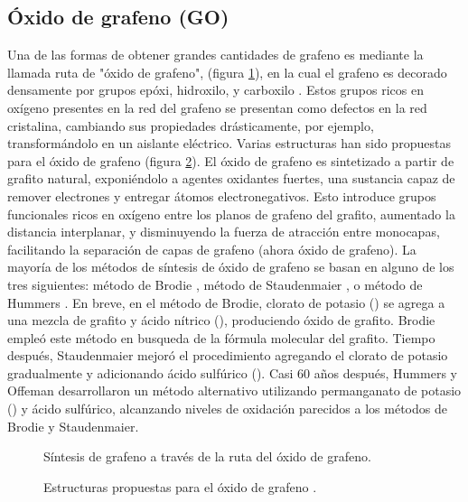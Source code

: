 \subsection*{Óxido de grafeno (GO)}
Una de las formas de obtener grandes cantidades de grafeno es mediante la llamada ruta de "óxido de grafeno", (figura \ref{fig:graphiteToRGO}), en la cual el grafeno es decorado densamente por grupos epóxi, hidroxilo, y carboxilo \citep{Dreyer2010}. Estos grupos ricos en oxígeno presentes en la red del grafeno se presentan como defectos en la red cristalina, cambiando sus propiedades drásticamente, por ejemplo, transformándolo en un aislante eléctrico. Varias estructuras han sido propuestas para el óxido de grafeno (figura \ref{fig:GO_structure}).
El óxido de grafeno es sintetizado a partir de grafito natural, exponiéndolo a agentes oxidantes fuertes, una sustancia capaz de remover electrones y entregar átomos electronegativos. Esto introduce grupos funcionales ricos en oxígeno entre los planos de grafeno del grafito, aumentado la distancia interplanar, y disminuyendo la fuerza de atracción entre monocapas, facilitando la separación de capas de grafeno (ahora óxido de grafeno). La mayoría de los métodos de síntesis de óxido de grafeno se basan en alguno de los tres siguientes: método de Brodie \citep{Brodie1859}, método de Staudenmaier \citep{Staudenmaier1898}, o método de Hummers \citep{Hummers1958}. En breve, en el método de Brodie, clorato de potasio () se agrega a una mezcla de grafito y ácido nítrico (), produciendo óxido de grafito. Brodie empleó este método en busqueda de la fórmula molecular del grafito. Tiempo después, Staudenmaier mejoró el procedimiento agregando el clorato de potasio gradualmente y adicionando ácido sulfúrico (). Casi 60 años después, Hummers y Offeman desarrollaron un método alternativo utilizando permanganato de potasio () y ácido sulfúrico, alcanzando niveles de oxidación parecidos a los métodos de Brodie y Staudenmaier.
\begin{figure}
	\centering
	\caption[Síntesis de grafeno a través de la ruta del óxido de grafeno]{Síntesis de grafeno a través de la ruta del óxido de grafeno.}
	\label{fig:graphiteToRGO}
\end{figure}

\begin{figure}
	\centering
	\caption[Estructura de óxido de grafeno]{Estructuras propuestas para el óxido de grafeno \citep{Dreyer2010}.}
	\label{fig:GO_structure}
\end{figure}


